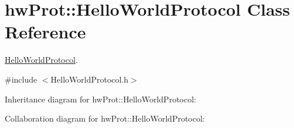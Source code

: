 \hypertarget{classhwProt_1_1HelloWorldProtocol}{}\section{hw\+Prot\+::Hello\+World\+Protocol Class Reference}
\label{classhwProt_1_1HelloWorldProtocol}


\mbox{\hyperlink{classhwProt_1_1HelloWorldProtocol}{Hello\+World\+Protocol}}.  




{\ttfamily \#include $<$Hello\+World\+Protocol.\+h$>$}



Inheritance diagram for hw\+Prot\+::Hello\+World\+Protocol\+:


Collaboration diagram for hw\+Prot\+::Hello\+World\+Protocol\+:
